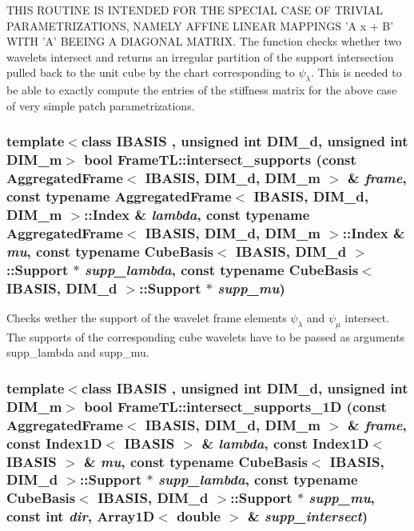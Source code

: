 THIS ROUTINE IS INTENDED FOR THE SPECIAL CASE OF TRIVIAL PARAMETRIZATIONS, NAMELY AFFINE LINEAR MAPPINGS 'A x + B' WITH 'A' BEEING A DIAGONAL MATRIX. The function checks whether two wavelets intersect and returns an irregular partition of the support intersection pulled back to the unit cube by the chart corresponding to $\psi_\lambda$. This is needed to be able to exactly compute the entries of the stiffness matrix for the above case of very simple patch parametrizations. \hypertarget{namespaceFrameTL_6d6670ec9613c9cf6ac3511a4b623429}{
\subsubsection[{intersect\_\-supports}]{\setlength{\rightskip}{0pt plus 5cm}template$<$class IBASIS , unsigned int DIM\_\-d, unsigned int DIM\_\-m$>$ bool FrameTL::intersect\_\-supports (const AggregatedFrame$<$ IBASIS, DIM\_\-d, DIM\_\-m $>$ \& {\em frame}, \/  const typename AggregatedFrame$<$ IBASIS, DIM\_\-d, DIM\_\-m $>$::Index \& {\em lambda}, \/  const typename AggregatedFrame$<$ IBASIS, DIM\_\-d, DIM\_\-m $>$::Index \& {\em mu}, \/  const typename CubeBasis$<$ IBASIS, DIM\_\-d $>$::Support $\ast$ {\em supp\_\-lambda}, \/  const typename CubeBasis$<$ IBASIS, DIM\_\-d $>$::Support $\ast$ {\em supp\_\-mu})}}
\label{namespaceFrameTL_6d6670ec9613c9cf6ac3511a4b623429}


Checks wether the support of the wavelet frame elements $\psi_\lambda$ and $\psi_\mu$ intersect. The supports of the corresponding cube wavelets have to be passed as arguments supp\_\-lambda and supp\_\-mu. \hypertarget{namespaceFrameTL_02c30f3ec04242a2445af8e588bae6b2}{
\subsubsection[{intersect\_\-supports\_\-1D}]{\setlength{\rightskip}{0pt plus 5cm}template$<$class IBASIS , unsigned int DIM\_\-d, unsigned int DIM\_\-m$>$ bool FrameTL::intersect\_\-supports\_\-1D (const AggregatedFrame$<$ IBASIS, DIM\_\-d, DIM\_\-m $>$ \& {\em frame}, \/  const Index1D$<$ IBASIS $>$ \& {\em lambda}, \/  const Index1D$<$ IBASIS $>$ \& {\em mu}, \/  const typename CubeBasis$<$ IBASIS, DIM\_\-d $>$::Support $\ast$ {\em supp\_\-lambda}, \/  const typename CubeBasis$<$ IBASIS, DIM\_\-d $>$::Support $\ast$ {\em supp\_\-mu}, \/  const int {\em dir}, \/  Array1D$<$ double $>$ \& {\em supp\_\-intersect})}}
\label{namespaceFrameTL_02c30f3ec04242a2445af8e588bae6b2}


